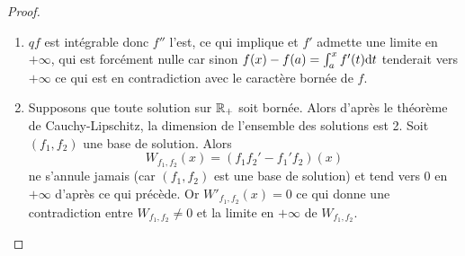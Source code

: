 \documentclass[12pt]{article}
\begin{document}
\begin{proof}
	\phantom{}
	\begin{enumerate}
		\item $qf$ est intégrable donc $f''$ l'est, ce qui implique et $f'$ admette une limite en $+\infty$, qui est forcément nulle car sinon $f(x)-f(a)=\int_{a}^{x}f'(t)\mathrm{d} t$ tenderait vers $+\infty$ ce qui est en contradiction avec le caractère bornée de $f$.
		\item Supposons que toute solution sur $\mathbb{R}_{+}$ soit bornée. Alors d'après le théorème de Cauchy-Lipschitz, la dimension de l'ensemble des solutions est 2. Soit $(f_1,f_2)$ une base de solution. Alors 
		\begin{equation*}
			W_{f_1,f_2}(x)=(f_1 f_2'-f_1' f_2)(x)
		\end{equation*}
		ne s'annule jamais (car $(f_1,f_2)$ est une base de solution) et tend vers 0 en $+\infty$ d'après ce qui précède. Or $W'_{f_1,f_2}(x)=0$ ce qui donne une contradiction entre $W_{f_1,f_2}\neq0$ et  la limite en $+\infty$ de $W_{f_1,f_2}$.
	\end{enumerate}
\end{proof}
\end{document}
